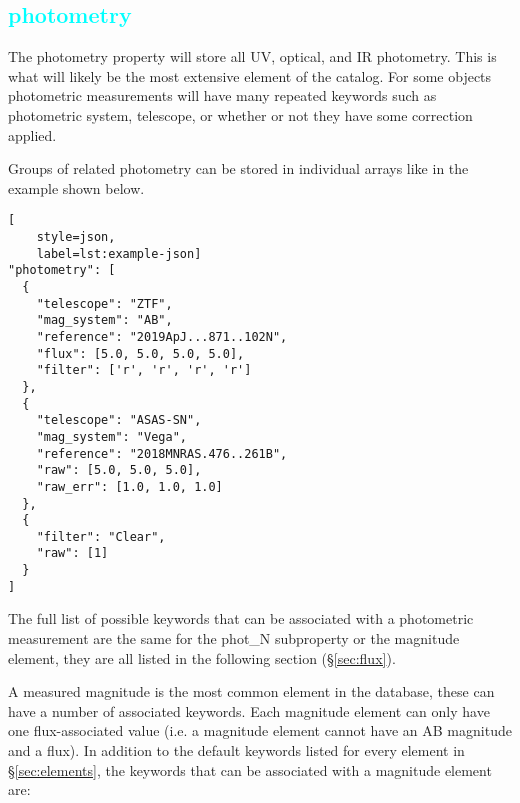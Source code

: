 \documentclass[tighten]{aastex631}
\newcommand{\property}[1]{\textcolor{cyan}{#1}}
\newcommand{\element}[1]{\textcolor{orange}{#1}}
\begin{document}
\subsection{\property{photometry}} \label{sec:photometry}

The photometry property will store all UV, optical, and IR photometry. This is what will likely be the most extensive element of the catalog. For some objects photometric measurements will have many repeated keywords such as photometric system, telescope, or whether or not they have some correction applied.

Groups of related photometry can be stored in individual arrays like in the example shown below.
\begin{lstlisting}[
    style=json,
    label=lst:example-json]
"photometry": [
  {
    "telescope": "ZTF",
    "mag_system": "AB",
    "reference": "2019ApJ...871..102N",
    "flux": [5.0, 5.0, 5.0, 5.0],
    "filter": ['r', 'r', 'r', 'r']
  },
  {
    "telescope": "ASAS-SN",
    "mag_system": "Vega",
    "reference": "2018MNRAS.476..261B",
    "raw": [5.0, 5.0, 5.0],
    "raw_err": [1.0, 1.0, 1.0]
  },
  {
    "filter": "Clear",
    "raw": [1]
  }
]
\end{lstlisting}
The full list of possible keywords that can be associated with a photometric measurement are the same for the phot\_N subproperty or the magnitude element, they are all listed in the following section (\S\ref{sec:flux}).


A measured magnitude is the most common element in the database, these can have a number of associated keywords. Each magnitude element can only have one flux-associated value (i.e. a magnitude element cannot have an AB magnitude and a flux). In addition to the default keywords listed for every element in \S\ref{sec:elements}, the keywords that can be associated with a magnitude element are:
\end{document}
